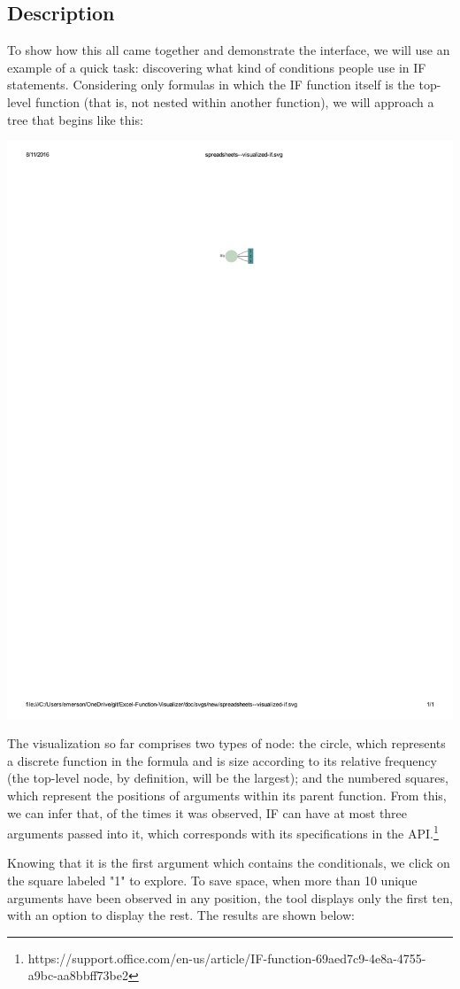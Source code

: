 \documentclass[conference]{IEEEtran}
\begin{document}
\subsection{Description}
To show how this all came together and demonstrate the interface, we will use an example of a quick task: discovering what kind of conditions people use in IF statements. Considering only formulas in which the IF function itself is the top-level function (that is, not nested within another function), we will approach a tree that begins like this:
 
\includegraphics{start}

The visualization so far comprises two types of node: the circle, which represents a discrete function in the formula and is size according to its relative frequency (the top-level node, by definition, will be the largest); and the numbered squares, which represent the positions of arguments within its parent function. From this, we can infer that, of the times it was observed, IF can have at most three arguments passed into it, which corresponds with its specifications in the API.\footnote{https://support.office.com/en-us/article/IF-function-69aed7c9-4e8a-4755-a9bc-aa8bbff73be2} \par
Knowing that it is the first argument which contains the conditionals, we click on the square labeled "1" to explore. To save space, when more than 10 unique arguments have been observed in any position, the tool displays only the first ten, with an option to display the rest. The results are shown below:
\end{document}
